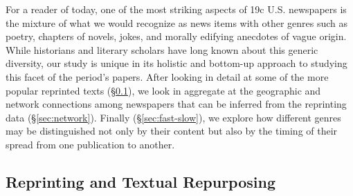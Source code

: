 \documentclass[pdftex,11pt]{article}
\begin{document}
For a reader of today, one of the most striking aspects of 19c
U.S. newspapers is the mixture of what we would recognize as news
items with other genres such as poetry, chapters of novels, jokes, and
morally edifying anecdotes of vague origin.  While historians and literary scholars have long known about this generic diversity, our study is unique in its holistic and bottom-up approach to studying this facet of the period's papers. After looking in detail
at some of the more popular reprinted texts
(\S\ref{sec:top-reprints}), we look in aggregate at the geographic and
network connections among newspapers that can be inferred from the
reprinting data (\S\ref{sec:network}).  Finally
(\S\ref{sec:fast-slow}), we explore how different genres may be
distinguished not only by their content but also by the timing of
their spread from one publication to another.

\subsection{Reprinting and Textual Repurposing}
\label{sec:top-reprints}
\end{document}
